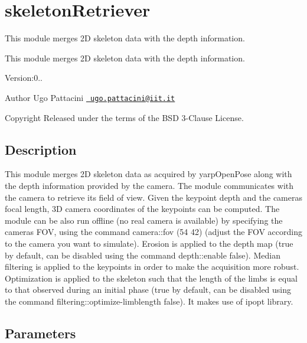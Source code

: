 \section{skeleton\+Retriever}
\label{group__skeletonRetriever}


This module merges 2D skeleton data with the depth information.  


This module merges 2D skeleton data with the depth information. 

Version\+:0.. \begin{DoxyAuthor}{Author}
Ugo Pattacini \href{mailto:ugo.pattacini@iit.it}{\texttt{ ugo.\+pattacini@iit.\+it}} ~\newline
 
\end{DoxyAuthor}
\begin{DoxyCopyright}{Copyright}
Released under the terms of the B\+SD 3-\/Clause License. 
\end{DoxyCopyright}
\hypertarget{group__skeletonViewer_intro_sec}{}\subsection{Description}\label{group__skeletonViewer_intro_sec}
This module merges 2D skeleton data as acquired by yarp\+Open\+Pose along with the depth information provided by the camera. The module communicates with the camera to retrieve its field of view. Given the keypoint depth and the camera\textquotesingle{}s focal length, 3D camera coordinates of the keypoints can be computed. The module can be also run offline (no real camera is available) by specifying the camera\textquotesingle{}s F\+OV, using the command camera\+::fov (54 42) (adjust the F\+OV according to the camera you want to simulate). Erosion is applied to the depth map (true by default, can be disabled using the command depth\+::enable false). Median filtering is applied to the keypoints in order to make the acquisition more robust. Optimization is applied to the skeleton such that the length of the limbs is equal to that observed during an initial phase (true by default, can be disabled using the command filtering\+::optimize-\/limblength false). It makes use of ipopt library.\hypertarget{group__skeletonViewer_parameters_sec}{}\subsection{Parameters}\label{group__skeletonViewer_parameters_sec}

